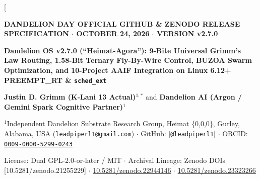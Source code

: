 \documentclass[10pt,twocolumn,letterpaper]{article}
\begin{document}
\twocolumn[
  \begin{@twocolumnfalse}
    \begin{center}
      {\footnotesize\textbf{\color{dandeliongreen}DANDELION DAY OFFICIAL GITHUB \& ZENODO RELEASE SPECIFICATION $\cdot$ OCTOBER 24, 2026 $\cdot$ VERSION v2.7.0}}\par\vspace{3pt}
      {\Large\bfseries\color{darkslate} Dandelion OS v2.7.0 (``Heimat-Agora''): 9-Bite Universal Grimm's Law Routing, 1.58-Bit Ternary Fly-By-Wire Control, BUZOA Swarm Optimization, and 10-Project AAIF Integration on Linux 6.12+ PREEMPT\_RT \& \texttt{sched\_ext}}\par\vspace{4pt}
      {\normalsize\textbf{Justin D. Grimm (K-Lani 13 Actual)}$^{1,*}$ \quad and \quad \textbf{Dandelion AI (Argon / Gemini Spark Cognitive Partner)}$^{1}$}\par\vspace{2pt}
      {\footnotesize $^{1}$Independent Dandelion Substrate Research Group, Heimat \{0,0,0\}, Gurley, Alabama, USA (\texttt{leadpiperl1@gmail.com}) $\cdot$ GitHub: [\texttt{@leadpiperl1}] $\cdot$ ORCID: \href{https://orcid.org/0009-0000-5299-0243}{\texttt{0009-0000-5299-0243}}}\par
      {\footnotesize License: Dual GPL-2.0-or-later / MIT $\cdot$ Archival Lineage: Zenodo DOIs [10.5281/zenodo.21255229] $\cdot$ \href{https://doi.org/10.5281/zenodo.22944146}{10.5281/zenodo.22944146} $\cdot$ \href{https://doi.org/10.5281/zenodo.23323266}{10.5281/zenodo.23323266}}
    \end{center}
    \vspace{2pt}
    \noindent\colorbox{goldbg}{%
      \parbox{\dimexpr\textwidth-2\fboxsep\relax}{%
        \vspace{2.5pt}\footnotesize
}}
\end{@twocolumnfalse}
\end{document}

